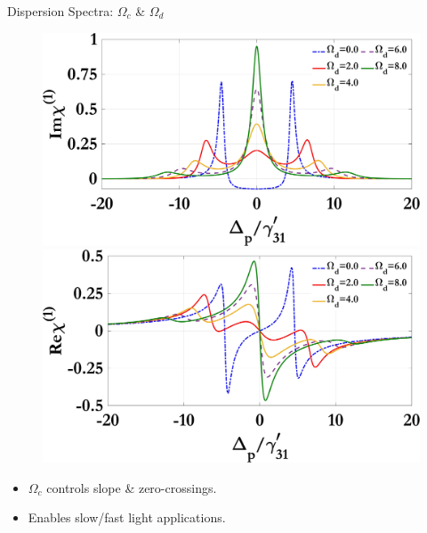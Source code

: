 \documentclass{beamer}
\begin{document}
\begin{frame}{Dispersion Spectra: $\Omega_c$ \& $\Omega_d$}
  \vspace{-37pt}
  \begin{figure}[h]
    \centering
    \begin{minipage}{0.48\textwidth}
      \centering
      \includegraphics[width=\linewidth]{Assets/Img_chi1_Omega_d.jpeg}
      \subcaption{}
    \end{minipage}
    \hfill
    \begin{minipage}{0.48\textwidth}
      \centering
      \includegraphics[width=\linewidth]{Assets/Real_chi1_Omega_d.jpeg}
      \subcaption{}
    \end{minipage}\label{fig:chi1_d}
   \end{figure}\begin{itemize}
    \item $\Omega_c$ controls slope \& zero-crossings.
    \item Enables slow/fast light applications.
  \end{itemize}
\end{frame}
\end{document}
